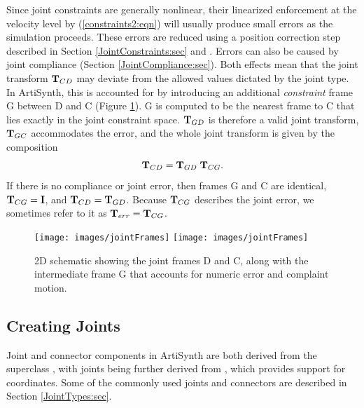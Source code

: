 Since joint constraints are generally nonlinear, their linearized
enforcement at the velocity level by (\ref{constraints2:eqn}) will
usually produce small errors as the simulation proceeds.  These errors
are reduced using a position correction step described in
Section \ref{JointConstraints:sec} and \cite{lloyd2012artisynth}.
Errors can also be caused by joint compliance
(Section \ref{JointCompliance:sec}).  Both effects mean that the joint
transform ${\bf T}_{CD}$ may deviate from the allowed values dictated by
the joint type. In ArtiSynth, this is accounted for by introducing an
additional {\it constraint} frame G between D and C
(Figure \ref{jointFrames:fig}).  G is computed to be the nearest frame
to C that lies exactly in the joint constraint space. ${\bf T}_{GD}$ is
therefore a valid joint transform, ${\bf T}_{GC}$ accommodates the error,
and the whole joint transform is given by the composition
%
\begin{equation}
{\bf T}_{CD} = {\bf T}_{GD} \; {\bf T}_{CG}.
\end{equation}
%
If there is no compliance or joint error, then frames G and C are
identical, ${\bf T}_{CG} = {\bf I}$, and ${\bf T}_{CD} = {\bf T}_{GD}$.  Because ${\bf T}_{CG}$
describes the joint error, we sometimes refer to it as ${\bf T}_{err}
= {\bf T}_{CG}$.

\begin{figure}[ht]
\begin{center}
 \iflatexml
   \texttt{[image: images/jointFrames]}
 \else
   \texttt{[image: images/jointFrames]}
 \fi
\end{center}
\caption{2D schematic showing the joint frames D and C, along with
the intermediate frame G that accounts for numeric error
and complaint motion.}
\label{jointFrames:fig}
\end{figure}

\subsection{Creating Joints}
\label{CreatingJoints:sec}

Joint and connector components in ArtiSynth are both derived from the
superclass
,
with joints being further derived from
,
which provides support for coordinates.  Some of the commonly used
joints and connectors are described in Section
\ref{JointTypes:sec}.


